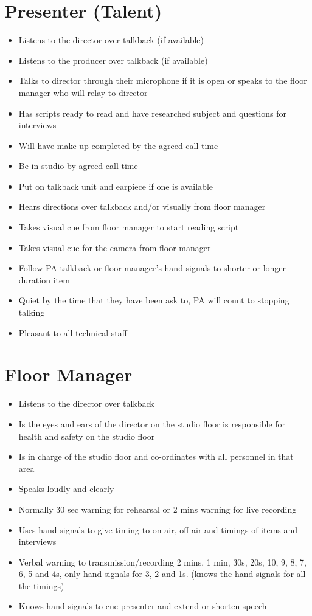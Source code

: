 \documentclass[7pt,a5paper]{book}
\begin{document}
\newpage
\section{Presenter (Talent)}
\begin{itemize}
    \item Listens to the director over talkback (if available)
    \item Listens to the producer over talkback (if available)
    \item Talks to director through their microphone if it is open or speaks to the floor manager who will relay to director
    \item Has scripts ready to read and have researched subject and questions for interviews
    \item Will have make-up completed by the agreed call time
    \item Be in studio by agreed call time
    \item Put on talkback unit and earpiece if one is available
    \item Hears directions over talkback and/or visually from floor manager
    \item Takes visual cue from floor manager to start reading script
    \item Takes visual cue for the camera from floor manager
    \item Follow PA talkback or floor manager's hand signals to shorter or longer duration item
    \item Quiet by the time that they have been ask to, PA will count to stopping talking
    \item Pleasant to all technical staff
\end{itemize}

\newpage
\section{Floor Manager}
\begin{itemize}
    \item Listens to the director over talkback
    \item Is the eyes and ears of the director on the studio floor is responsible for health and safety on the studio floor
    \item Is in charge of the studio floor and co-ordinates with all personnel in that area
    \item Speaks loudly and clearly
    \item Normally 30 sec warning for rehearsal or 2 mins warning for live recording
    \item Uses hand signals to give timing to on-air, off-air and timings of items and interviews
    \item Verbal warning to transmission/recording 2 mins, 1 min, 30s, 20s, 10, 9, 8, 7, 6, 5 and 4s, only hand signals for 3, 2 and 1s. (knows the hand signals for all the timings)
    \item Knows hand signals to cue presenter and extend or shorten speech
\end{itemize}
\end{document}
